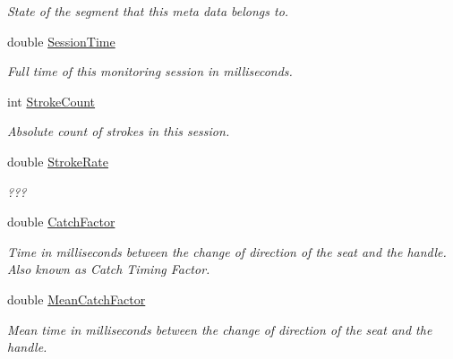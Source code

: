\begin{DoxyCompactItemize}
\begin{DoxyCompactList}\small\item\em State of the segment that this meta data belongs to. \end{DoxyCompactList}\item 
double \hyperlink{struct_rowing_monitor_1_1_model_1_1_util_1_1_rowing_meta_data_a6b022eb7dc4c2f43b268e9dfd6b64f40}{Session\+Time}
\begin{DoxyCompactList}\small\item\em Full time of this monitoring session in milliseconds. \end{DoxyCompactList}\item 
int \hyperlink{struct_rowing_monitor_1_1_model_1_1_util_1_1_rowing_meta_data_ab239dacce3cc8f8aecf57b529d3b18e7}{Stroke\+Count}
\begin{DoxyCompactList}\small\item\em Absolute count of strokes in this session. \end{DoxyCompactList}\item 
double \hyperlink{struct_rowing_monitor_1_1_model_1_1_util_1_1_rowing_meta_data_a8cf515fd8a5e7339192fb0a9aabfd721}{Stroke\+Rate}
\begin{DoxyCompactList}\small\item\em ??? \end{DoxyCompactList}\item 
double \hyperlink{struct_rowing_monitor_1_1_model_1_1_util_1_1_rowing_meta_data_aa16578566b33c3a692a1040ede071d2a}{Catch\+Factor}
\begin{DoxyCompactList}\small\item\em Time in milliseconds between the change of direction of the seat and the handle. Also known as Catch Timing Factor. \end{DoxyCompactList}\item 
double \hyperlink{struct_rowing_monitor_1_1_model_1_1_util_1_1_rowing_meta_data_a141b6b4cc593aa32e034b30dea6820b0}{Mean\+Catch\+Factor}
\begin{DoxyCompactList}\small\item\em Mean time in milliseconds between the change of direction of the seat and the handle. \end{DoxyCompactList}\item 

\end{DoxyCompactItemize}
